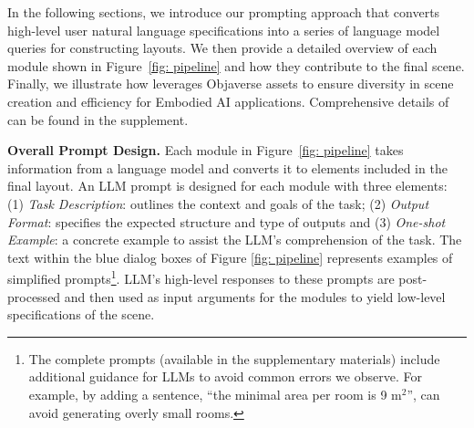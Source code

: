In the following sections, we introduce our prompting approach that converts high-level user natural language specifications into a series of language model queries for constructing layouts. 
We then provide a detailed overview of each module shown in Figure~\ref{fig: pipeline} and how they contribute to the final scene. %
Finally, we illustrate how \holodeck leverages Objaverse assets to ensure diversity in scene creation and efficiency for Embodied AI applications. Comprehensive details of \holodeck can be found in the supplement.




\smallbreak
\noindent \textbf{Overall Prompt Design.} %
Each module in Figure~\ref{fig: pipeline} takes information from a language model and converts it to elements included in the final layout.
An LLM prompt is designed for each module with three elements: (1) \textit{Task Description}: outlines the context and goals of the task; (2) \textit{Output Format}: specifies the expected structure and type of outputs and (3) \textit{One-shot Example}: a concrete example to assist the LLM's comprehension of the task. The text within the blue dialog boxes of Figure \ref{fig: pipeline} represents examples of simplified prompts\footnote{The complete prompts (available in the supplementary materials) include additional guidance for LLMs to avoid common errors we observe. For example, by adding a sentence, ``the minimal area per room is 9 m$^2$'', \holodeck can avoid generating overly small rooms.}. LLM's high-level responses to these prompts are post-processed and then used as input arguments for the modules to yield low-level specifications of the scene.%

